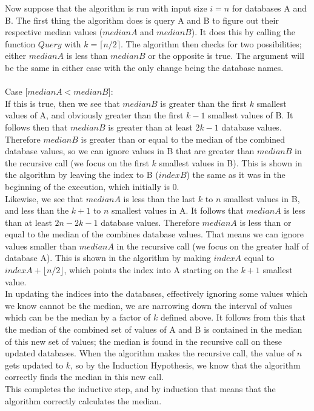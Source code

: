 \documentclass[12pt, oneside]{article}
\begin{document}
Now suppose that the algorithm is run with input size $i=n$ for databases A and B. The first thing the algorithm does is query A and B to figure out their respective median values ($medianA$ and $medianB$). It does this by calling the function $Query$ with $k=\lceil n/2 \rceil$. The algorithm then checks for two possibilities; either $medianA$ is less than $medianB$ or the opposite is true. The argument will be the same in either case with the only change being the database names.\\\\
Case [$medianA < medianB$]:\\
If this is true, then we see that $medianB$ is greater than the first $k$ smallest values of A, and obviously greater than the first $k-1$ smallest values of B. It follows then that $medianB$ is greater than at least $2k-1$ database values. Therefore $medianB$ is greater than or equal to the median of the combined database values, so we can ignore values in B that are greater than $medianB$ in the recursive call (we focus on the first $k$ smallest values in B). This is shown in the algorithm by leaving the index to B ($indexB$) the same as it was in the beginning of the execution, which initially is 0.\\
Likewise, we see that $medianA$ is less than the last $k$ to $n$ smallest values in B, and less than the $k+1$ to $n$ smallest values in A. It follows that $medianA$ is less than at least $2n-2k-1$ database values. Therefore $medianA$ is less than or equal to the median of the combines database values. That means we can ignore values smaller than $medianA$ in the recursive call (we focus on the greater half of database A). This is shown in the algorithm by making $indexA$ equal to $indexA+\lfloor n/2 \rfloor$, which points the index into A starting on the $k+1$ smallest value.\\
In updating the indices into the databases, effectively ignoring some values which we know cannot be the median, we are narrowing down the interval of values which can be the median by a factor of $k$ defined above. It follows from this that the median of the combined set of values of A and B is contained in the median of this new set of values; the median is found in the recursive call on these updated databases. When the algorithm makes the recursive call, the value of $n$ gets updated to $k$, so by the Induction Hypothesis, we know that the algorithm correctly finds the median in this new call.\\
This completes the inductive step, and by induction that means that the algorithm correctly calculates the median.\\
\end{document}
